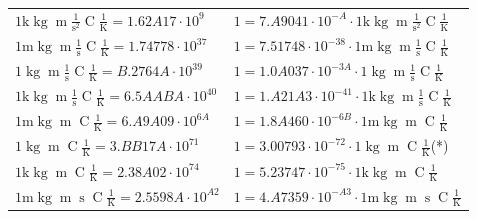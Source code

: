 \begin{center}
\begin{longtable}{l l}
{\color{gray}$1 \bm{\mathrm{ k}}\operatorname{kg}{\operatorname{m}}\frac1{\operatorname{s}^2}{\operatorname{C}}\frac1{\operatorname{K}} = 1.62A17\cdot10^{9} $}   & {\color{gray}$ 1 = 7.A9041\cdot10^{-A} \cdot 1 \bm{\mathrm{ k}}\operatorname{kg}{\operatorname{m}}\frac1{\operatorname{s}^2}{\operatorname{C}}\frac1{\operatorname{K}}$}  \\
{\color{gray}$1 \bm{\mathrm{ m}}\operatorname{kg}{\operatorname{m}}\frac1{\operatorname{s}}{\operatorname{C}}\frac1{\operatorname{K}} = 1.74778\cdot10^{37} $}   & {\color{gray}$ 1 = 7.51748\cdot10^{-38} \cdot 1 \bm{\mathrm{ m}}\operatorname{kg}{\operatorname{m}}\frac1{\operatorname{s}}{\operatorname{C}}\frac1{\operatorname{K}}$}  \\
{\color{black}$1 \bm{\mathrm{ }}\operatorname{kg}{\operatorname{m}}\frac1{\operatorname{s}}{\operatorname{C}}\frac1{\operatorname{K}} = B.2764A\cdot10^{39} $}   & {\color{black}$ 1 = 1.0A037\cdot10^{-3A} \cdot 1 \bm{\mathrm{ }}\operatorname{kg}{\operatorname{m}}\frac1{\operatorname{s}}{\operatorname{C}}\frac1{\operatorname{K}}$}  \\
{\color{gray}$1 \bm{\mathrm{ k}}\operatorname{kg}{\operatorname{m}}\frac1{\operatorname{s}}{\operatorname{C}}\frac1{\operatorname{K}} = 6.5AABA\cdot10^{40} $}   & {\color{gray}$ 1 = 1.A21A3\cdot10^{-41} \cdot 1 \bm{\mathrm{ k}}\operatorname{kg}{\operatorname{m}}\frac1{\operatorname{s}}{\operatorname{C}}\frac1{\operatorname{K}}$}  \\
{\color{gray}$1 \bm{\mathrm{ m}}\operatorname{kg}{\operatorname{m}}{}{\operatorname{C}}\frac1{\operatorname{K}} = 6.A9A09\cdot10^{6A} $}   & {\color{gray}$ 1 = 1.8A460\cdot10^{-6B} \cdot 1 \bm{\mathrm{ m}}\operatorname{kg}{\operatorname{m}}{}{\operatorname{C}}\frac1{\operatorname{K}}$}  \\
{\color{black}$1 \bm{\mathrm{ }}\operatorname{kg}{\operatorname{m}}{}{\operatorname{C}}\frac1{\operatorname{K}} = 3.BB17A\cdot10^{71} $}   & {\color{black}$ 1 = 3.00793\cdot10^{-72} \cdot 1 \bm{\mathrm{ }}\operatorname{kg}{\operatorname{m}}{}{\operatorname{C}}\frac1{\operatorname{K}}$}\quad(*)\\
{\color{gray}$1 \bm{\mathrm{ k}}\operatorname{kg}{\operatorname{m}}{}{\operatorname{C}}\frac1{\operatorname{K}} = 2.38A02\cdot10^{74} $}   & {\color{gray}$ 1 = 5.23747\cdot10^{-75} \cdot 1 \bm{\mathrm{ k}}\operatorname{kg}{\operatorname{m}}{}{\operatorname{C}}\frac1{\operatorname{K}}$}  \\
{\color{gray}$1 \bm{\mathrm{ m}}\operatorname{kg}{\operatorname{m}}{\operatorname{s}}{\operatorname{C}}\frac1{\operatorname{K}} = 2.5598A\cdot10^{A2} $}   & {\color{gray}$ 1 = 4.A7359\cdot10^{-A3} \cdot 1 \bm{\mathrm{ m}}\operatorname{kg}{\operatorname{m}}{\operatorname{s}}{\operatorname{C}}\frac1{\operatorname{K}}$}  \\

\end{longtable}
\end{center}
